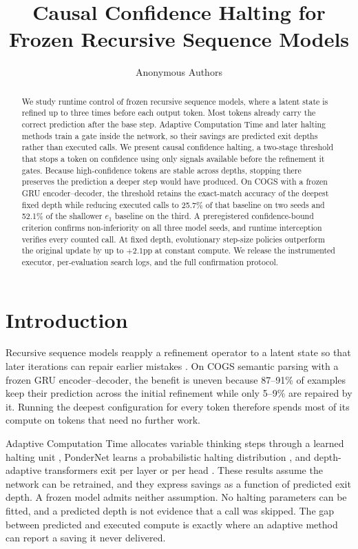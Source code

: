 \documentclass[11pt]{article}
\title{Causal Confidence Halting for Frozen Recursive Sequence Models}
\author{Anonymous Authors}
\begin{document}
\maketitle

\begin{abstract}
We study runtime control of frozen recursive sequence models, where a latent state is refined up to three times before each output token. Most tokens already carry the correct prediction after the base step. Adaptive Computation Time \citep{graves2016adaptive} and later halting methods train a gate inside the network, so their savings are predicted exit depths rather than executed calls. We present causal confidence halting, a two-stage threshold that stops a token on confidence using only signals available before the refinement it gates. Because high-confidence tokens are stable across depths, stopping there preserves the prediction a deeper step would have produced. On COGS with a frozen GRU encoder--decoder, the threshold retains the exact-match accuracy of the deepest fixed depth while reducing executed calls to 25.7\% of that baseline on two seeds and 52.1\% of the shallower $e_1$ baseline on the third. A preregistered confidence-bound criterion confirms non-inferiority on all three model seeds, and runtime interception verifies every counted call. At fixed depth, evolutionary step-size policies outperform the original update by up to $+2.1$pp at constant compute. We release the instrumented executor, per-evaluation search logs, and the full confirmation protocol.
\end{abstract}

\section{Introduction}
\label{sec:intro}

Recursive sequence models reapply a refinement operator to a latent state so that later iterations can repair earlier mistakes \citep{graves2016adaptive,dehghani2019universal}. On COGS semantic parsing \citep{kim2020cogs} with a frozen GRU encoder--decoder, the benefit is uneven because 87--91\% of examples keep their prediction across the initial refinement while only 5--9\% are repaired by it. Running the deepest configuration for every token therefore spends most of its compute on tokens that need no further work.

Adaptive Computation Time allocates variable thinking steps through a learned halting unit \citep{graves2016adaptive}, PonderNet learns a probabilistic halting distribution \citep{banino2021ponder}, and depth-adaptive transformers exit per layer or per head \citep{elbayad2020depth,schuster2022calm}. These results assume the network can be retrained, and they express savings as a function of predicted exit depth. A frozen model admits neither assumption. No halting parameters can be fitted, and a predicted depth is not evidence that a call was skipped. The gap between predicted and executed compute is exactly where an adaptive method can report a saving it never delivered.
\end{document}
